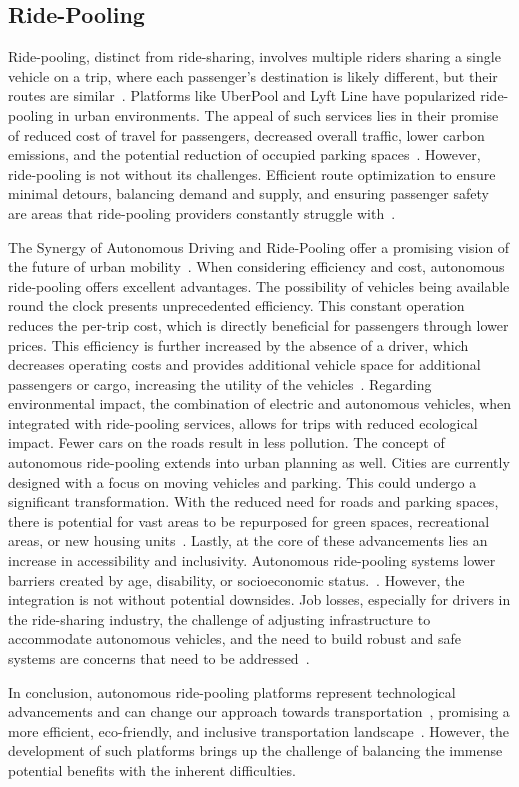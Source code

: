 \subsection{Ride-Pooling}
Ride-pooling, distinct from ride-sharing, involves multiple riders sharing a single vehicle on a trip, where each passenger's destination is likely different, but their routes are similar~\cite{Perivier.}. Platforms like UberPool and Lyft Line have popularized ride-pooling in urban environments. The appeal of such services lies in their promise of reduced cost of travel for passengers, decreased overall traffic, lower carbon emissions, and the potential reduction of occupied parking spaces~\cite{Shaheen.}.
However, ride-pooling is not without its challenges. Efficient route optimization to ensure minimal detours, balancing demand and supply, and ensuring passenger safety are areas that ride-pooling providers constantly struggle with~\cite{Perivier.}.

The Synergy of Autonomous Driving and Ride-Pooling offer a promising vision of the future of urban mobility~\cite{Stamadianos.2023}.
When considering efficiency and cost, autonomous ride-pooling offers excellent advantages. The possibility of vehicles being available round the clock presents unprecedented efficiency. This constant operation reduces the per-trip cost, which is directly beneficial for passengers through lower prices. This efficiency is further increased by the absence of a driver, which decreases operating costs and provides additional vehicle space for additional passengers or cargo, increasing the utility of the vehicles~\cite{Hacohen.2022,Stamadianos.2023}.
Regarding environmental impact, the combination of electric and autonomous vehicles, when integrated with ride-pooling services, allows  for trips with reduced ecological impact. Fewer cars on the roads result in less pollution\cite{Hacohen.2022,Stamadianos.2023}. The concept of autonomous ride-pooling extends into urban planning as well.  Cities are currently designed with a focus on  moving vehicles and parking. This could undergo a significant transformation. With the reduced need for roads and parking spaces, there is potential for vast areas to be repurposed for green spaces, recreational areas, or new housing units~\cite{Stamadianos.2023}.
Lastly, at the core of these advancements lies an increase in accessibility and inclusivity.  Autonomous ride-pooling systems lower barriers created by age, disability, or socioeconomic status.~\cite{Hacohen.2022}.
However, the integration is not without potential downsides. Job losses, especially for drivers in the ride-sharing industry, the challenge of adjusting infrastructure to accommodate autonomous vehicles, and the need to build robust and safe systems are concerns that need to be addressed~\cite{Hacohen.2022}.

In conclusion, autonomous ride-pooling platforms represent technological advancements and can change our approach towards transportation~\cite{Shaheen.}, promising a more efficient, eco-friendly, and inclusive transportation landscape~\cite{Stamadianos.2023}. However, the development of such platforms brings up the challenge of balancing the immense potential benefits with the inherent difficulties. 